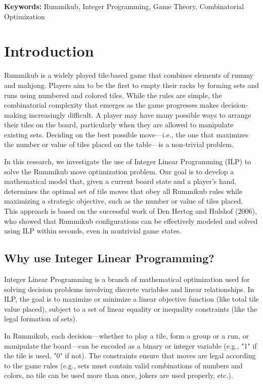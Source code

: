 \documentclass[11pt,letterpaper]{article}
\begin{document}
\smallskip
\noindent\textbf{Keywords:} Rummikub, Integer Programming, Game Theory, Combinatorial Optimization
\section*{Introduction}
Rummikub is a widely played tile-based game that combines elements of rummy and mahjong. 
Players aim to be the first to empty their racks by forming sets and runs using numbered 
and colored tiles. While the rules are simple, the combinatorial complexity that emerges 
as the game progresses makes decision-making increasingly difficult. A player may have 
many possible ways to arrange their tiles on the board, particularly when they are allowed 
to manipulate existing sets. Deciding on the best possible move—i.e., the one that maximizes 
the number or value of tiles placed on the table—is a non-trivial problem.

In this research, we investigate the use of Integer Linear Programming (ILP) to solve the 
Rummikub move optimization problem. Our goal is to develop a mathematical model that, given 
a current board state and a player's hand, determines the optimal set of tile moves that 
obey all Rummikub rules while maximizing a strategic objective, such as the number or 
value of tiles placed. This approach is based on the successful work of Den Hertog and 
Hulshof (2006), who showed that Rummikub configurations can be effectively modeled and 
solved using ILP within seconds, even in nontrivial game states.

\subsection*{Why use Integer Linear Programming?}
Integer Linear Programming is a branch of mathematical optimization used for solving decision
problems involving discrete variables and linear relationships. In ILP, the goal is to 
maximize or minimize a linear objective function (like total tile value placed), subject 
to a set of linear equality or inequality constraints (like the legal formation of sets).

In Rummikub, each decision—whether to play a tile, form a group or a run, or manipulate the 
board—can be encoded as a binary or integer variable (e.g., "1" if the tile is used, "0" if 
not). The constraints ensure that moves are legal according to the game rules (e.g., sets 
must contain valid combinations of numbers and colors, no tile can be used more than once, 
jokers are used properly, etc.).
\end{document}
